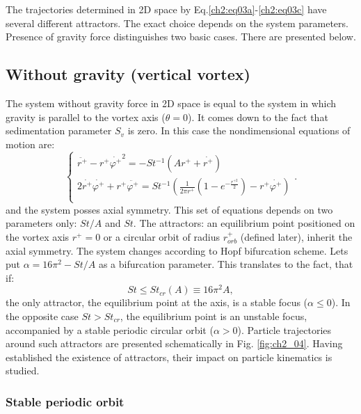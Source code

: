 \documentclass[../main.tex]{subfiles}
\begin{document}
The trajectories determined in 2D space by Eq.\ref{ch2:eq03a}-\ref{ch2:eq03c} have several different attractors. The exact choice depends on the system parameters. Presence of gravity force distinguishes two basic cases. There are presented below.

\subsection{Without gravity (vertical vortex)}
The system without gravity force in 2D space is equal to the system in which gravity is parallel to the vortex axis ($\theta=0$). It comes down to the fact that sedimentation parameter $S_v$ is zero. In this case the nondimensional equations of motion are:
\begin{equation}
\left\{\begin{array}{l}
\ddot{r^+}-r^+\dot{\varphi^+}^2=-St^{-1}\left(A r^++\dot{r^+}\right) \\
2\dot{r^+}\dot{\varphi^+}+r^+\ddot{\varphi^+}=St^{-1}\left(\frac{1}{2 \pi r^+}(1-e^{-\frac{r^{+ 2}}{2}})-r^+\dot{\varphi^+}\right)\\
\end{array}.\right.
\label{ch3:eq16}
\end{equation}
and the system posses axial symmetry. This set of equations depends on two parameters only: $St/A$ and $St$. The attractors: an equilibrium point positioned on the vortex axis $r^+=0$ or a circular orbit of radius $r^+_{orb}$ (defined later), inherit the axial symmetry. The system changes according to Hopf bifurcation scheme. Lets put $\alpha=16 \pi^2-St/A$ as a bifurcation parameter. This translates to the fact, that if:
\begin{equation}
St \leq St_{cr}(A) \equiv 16 \pi^2 A,
\label{ch3:eq17}
\end{equation}
the only attractor, the equilibrium point at the axis, is a stable focus ($\alpha \leq 0$). In the opposite case $St > St_{cr}$, the equilibrium point is an unstable focus, accompanied by a stable periodic circular orbit ($\alpha>0$). Particle trajectories around such attractors are presented schematically in Fig. \autoref{fig:ch2_04}. Having established the existence of attractors, their impact on particle kinematics is studied.\\

\subsubsection{Stable periodic orbit}
\end{document}
